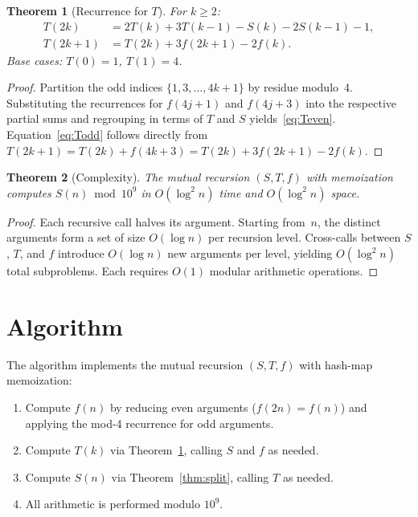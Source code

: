 \documentclass[11pt]{article}
\newtheorem{theorem}{Theorem}
\begin{document}
\begin{theorem}[Recurrence for $T$]
\label{thm:T}
For $k \ge 2$:
\begin{align}
T(2k) &= 2T(k) + 3T(k-1) - S(k) - 2S(k-1) - 1, \label{eq:Teven} \\
T(2k+1) &= T(2k) + 3f(2k+1) - 2f(k). \label{eq:Todd}
\end{align}
Base cases: $T(0) = 1$, $T(1) = 4$.
\end{theorem}

\begin{proof}
Partition the odd indices $\{1, 3, \ldots, 4k+1\}$ by residue modulo~4. Substituting the recurrences for $f(4j+1)$ and $f(4j+3)$ into the respective partial sums and regrouping in terms of $T$ and $S$ yields~\eqref{eq:Teven}. Equation~\eqref{eq:Todd} follows directly from $T(2k+1) = T(2k) + f(4k+3) = T(2k) + 3f(2k+1) - 2f(k)$.
\end{proof}

\begin{theorem}[Complexity]
\label{thm:complexity}
The mutual recursion $(S, T, f)$ with memoization computes $S(n) \bmod 10^9$ in $O(\log^2 n)$ time and $O(\log^2 n)$ space.
\end{theorem}

\begin{proof}
Each recursive call halves its argument. Starting from~$n$, the distinct arguments form a set of size $O(\log n)$ per recursion level. Cross-calls between $S$, $T$, and $f$ introduce $O(\log n)$ new arguments per level, yielding $O(\log^2 n)$ total subproblems. Each requires $O(1)$ modular arithmetic operations.
\end{proof}

\section{Algorithm}

The algorithm implements the mutual recursion $(S, T, f)$ with hash-map memoization:
\begin{enumerate}
    \item Compute $f(n)$ by reducing even arguments ($f(2n) = f(n)$) and applying the mod-4 recurrence for odd arguments.
    \item Compute $T(k)$ via Theorem~\ref{thm:T}, calling $S$ and $f$ as needed.
    \item Compute $S(n)$ via Theorem~\ref{thm:split}, calling $T$ as needed.
    \item All arithmetic is performed modulo $10^9$.
\end{enumerate}
\end{document}
